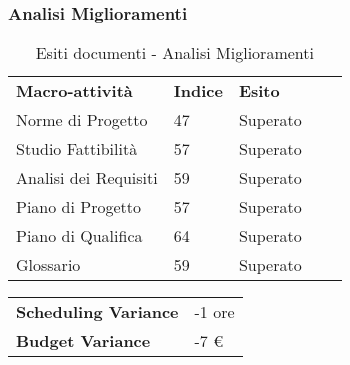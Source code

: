 \subsubsection{Analisi Miglioramenti}
\begin{table}[!ht]
			\centering
				\begin{tabular}{|l|l|l|ll}
					\cline{1-3}
					 \textbf{Macro-attività}  & \textbf{Indice \glossaryItem{Gulpease}}  & \textbf{Esito}  &  \\ \cline{1-3}
					 Norme di Progetto  & 47 & Superato &  \\ \cline{1-3}
					 Studio Fattibilità & 57 & Superato &  \\ \cline{1-3}
					 Analisi dei Requisiti & 59 & Superato &  \\ \cline{1-3}
					 Piano di Progetto & 57 & Superato &  \\ \cline{1-3}
					 Piano di Qualifica & 64 & Superato &  \\ \cline{1-3}
					 Glossario & 59 & Superato &  \\ \cline{1-3}
				\end{tabular}
				\caption{Esiti  documenti - Analisi Miglioramenti}
		\end{table}
		\begin{table}[!ht]
		\centering
		\begin{tabular}{l|l}
		\textbf{Scheduling Variance} & -1 ore \\
		\textbf{Budget Variance} & -7 \euro{} \\
		\end{tabular}
		\end{table}
